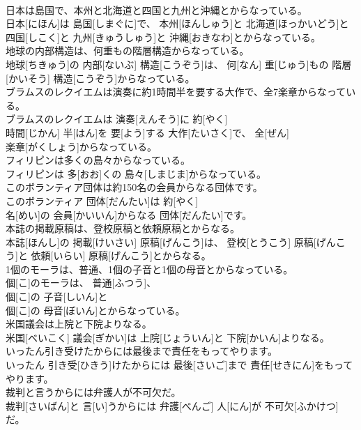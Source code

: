 \documentclass[8pt]{extreport}
\begin{document}
\begin{CJK}{UTF8}{min}
\\	日本は島国で、本州と北海道と四国と九州と沖縄とからなっている。	
\\	日本[にほん]は 島国[しまぐに]で、 本州[ほんしゅう]と 北海道[ほっかいどう]と 四国[しこく]と 九州[きゅうしゅう]と 沖縄[おきなわ]とからなっている。
\\	地球の内部構造は、何重もの階層構造からなっている。	
\\	地球[ちきゅう]の 内部[ないぶ] 構造[こうぞう]は、 何[なん] 重[じゅう]もの 階層[かいそう] 構造[こうぞう]からなっている。
\\	ブラムスのレクイエムは演奏に約1時間半を要する大作で、全7楽章からなっている。	
\\	ブラムスのレクイエムは 演奏[えんそう]に 約[やく] 
\\	時間[じかん] 半[はん]を 要[よう]する 大作[たいさく]で、 全[ぜん] 
\\	楽章[がくしょう]からなっている。
\\	フィリピンは多くの島々からなっている。	
\\	フィリピンは 多[おお]くの 島々[しまじま]からなっている。
\\	このボランティア団体は約150名の会員からなる団体です。	
\\	このボランティア 団体[だんたい]は 約[やく] 
\\	名[めい]の 会員[かいいん]からなる 団体[だんたい]です。
\\	本誌の掲載原稿は、登校原稿と依頼原稿とからなる。	
\\	本誌[ほんし]の 掲載[けいさい] 原稿[げんこう]は、 登校[とうこう] 原稿[げんこう]と 依頼[いらい] 原稿[げんこう]とからなる。
\\	1個のモーラは、普通、1個の子音と1個の母音とからなっている。	
\\	個[こ]のモーラは、 普通[ふつう]、 
\\	個[こ]の 子音[しいん]と 
\\	個[こ]の 母音[ぼいん]とからなっている。
\\	米国議会は上院と下院よりなる。	
\\	米国[べいこく] 議会[ぎかい]は 上院[じょういん]と 下院[かいん]よりなる。
\\	いったん引き受けたからには最後まで責任をもってやります。	
\\	いったん 引き受[ひきう]けたからには 最後[さいご]まで 責任[せきにん]をもってやります。
\\	裁判と言うからには弁護人が不可欠だ。	
\\	裁判[さいばん]と 言[い]うからには 弁護[べんご] 人[にん]が 不可欠[ふかけつ]だ。

\end{CJK}
\end{document}
